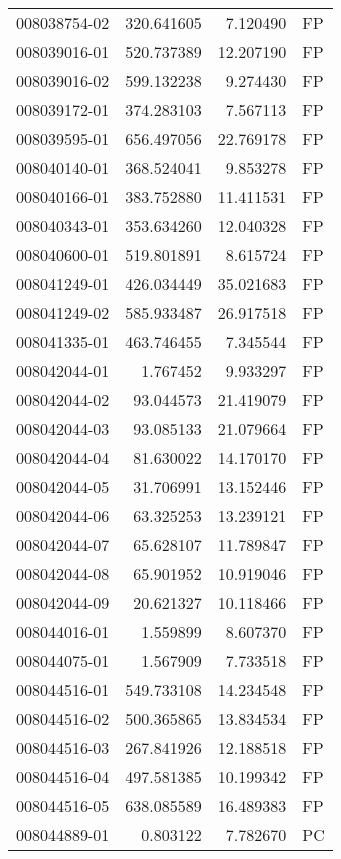 \begin{tabular}{lrrl}
008038754-02 &  320.641605 &     7.120490 &   FP \\
008039016-01 &  520.737389 &    12.207190 &   FP \\
008039016-02 &  599.132238 &     9.274430 &   FP \\
008039172-01 &  374.283103 &     7.567113 &   FP \\
008039595-01 &  656.497056 &    22.769178 &   FP \\
008040140-01 &  368.524041 &     9.853278 &   FP \\
008040166-01 &  383.752880 &    11.411531 &   FP \\
008040343-01 &  353.634260 &    12.040328 &   FP \\
008040600-01 &  519.801891 &     8.615724 &   FP \\
008041249-01 &  426.034449 &    35.021683 &   FP \\
008041249-02 &  585.933487 &    26.917518 &   FP \\
008041335-01 &  463.746455 &     7.345544 &   FP \\
008042044-01 &    1.767452 &     9.933297 &   FP \\
008042044-02 &   93.044573 &    21.419079 &   FP \\
008042044-03 &   93.085133 &    21.079664 &   FP \\
008042044-04 &   81.630022 &    14.170170 &   FP \\
008042044-05 &   31.706991 &    13.152446 &   FP \\
008042044-06 &   63.325253 &    13.239121 &   FP \\
008042044-07 &   65.628107 &    11.789847 &   FP \\
008042044-08 &   65.901952 &    10.919046 &   FP \\
008042044-09 &   20.621327 &    10.118466 &   FP \\
008044016-01 &    1.559899 &     8.607370 &   FP \\
008044075-01 &    1.567909 &     7.733518 &   FP \\
008044516-01 &  549.733108 &    14.234548 &   FP \\
008044516-02 &  500.365865 &    13.834534 &   FP \\
008044516-03 &  267.841926 &    12.188518 &   FP \\
008044516-04 &  497.581385 &    10.199342 &   FP \\
008044516-05 &  638.085589 &    16.489383 &   FP \\
008044889-01 &    0.803122 &     7.782670 &   PC \\

\end{tabular}
